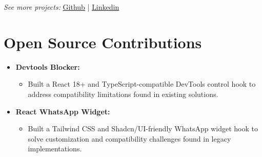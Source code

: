 \documentclass[10pt,a4paper]{article}
\begin{document}
{\vspace{0pt}
\noindent
{\centering
\textit{See more projects:}  
\href{https://github.com/abhijit47?tab=repositories}{\color{blue}Github} | 
\href{https://www.linkedin.com/in/abhijit-karmakar/details/projects/}{\color{blue}Linkedin}\par}

\section*{Open Source Contributions}
\vspace{-10pt}
\begin{itemize}[leftmargin=*, noitemsep]
    \item \textbf{Devtools Blocker:} 
    \begin{itemize}[leftmargin=*, noitemsep, topsep=2pt]
        \item Built a React 18+ and TypeScript-compatible DevTools control hook to address compatibility limitations found in existing solutions.
    \end{itemize}


    \item \textbf{React WhatsApp Widget:}
    \begin{itemize}[leftmargin=*, noitemsep, topsep=2pt]
        \item Built a Tailwind CSS and Shadcn/UI-friendly WhatsApp widget hook to solve customization and compatibility challenges found in legacy implementations.
    \end{itemize}



\end{itemize}}
\end{document}
